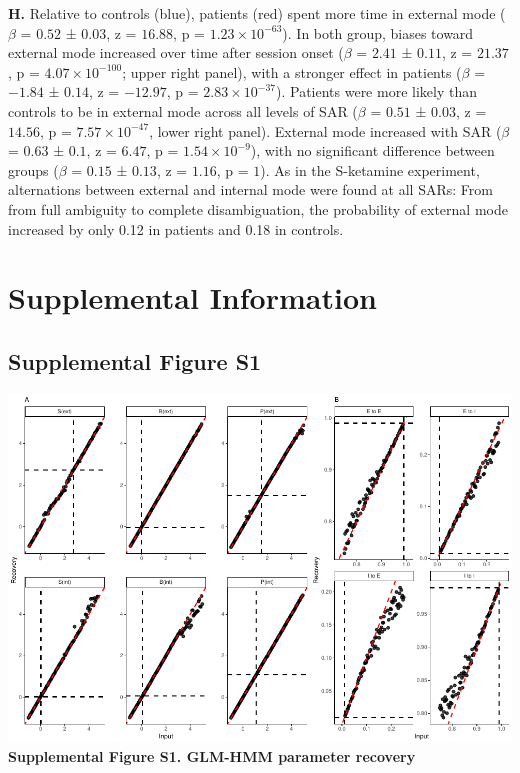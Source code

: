 \documentclass[
]{article}
\begin{document}
\textbf{H.} Relative to controls (blue), patients (red) spent more time
in external mode (\(\beta\) = \(0.52\) ± \(0.03\), z = \(16.88\), p =
\(\ensuremath{1.23\times 10^{-63}}\)). In both group, biases toward
external mode increased over time after session onset (\(\beta\) =
\(2.41\) ± \(0.11\), z = \(21.37\), p =
\(\ensuremath{4.07\times 10^{-100}}\); upper right panel), with a
stronger effect in patients (\(\beta\) = \(-1.84\) ± \(0.14\), z =
\(-12.97\), p = \(\ensuremath{2.83\times 10^{-37}}\)). Patients were
more likely than controls to be in external mode across all levels of
SAR (\(\beta\) = \(0.51\) ± \(0.03\), z = \(14.56\), p =
\(\ensuremath{7.57\times 10^{-47}}\), lower right panel). External mode
increased with SAR (\(\beta\) = \(0.63\) ± \(0.1\), z = \(6.47\), p =
\(\ensuremath{1.54\times 10^{-9}}\)), with no significant difference
between groups (\(\beta\) = \(0.15\) ± \(0.13\), z = \(1.16\), p =
\(1\)). As in the S-ketamine experiment, alternations between external
and internal mode were found at all SARs: From from full ambiguity to
complete disambiguation, the probability of external mode increased by
only 0.12 in patients and 0.18 in controls.

\newpage

\section{Supplemental Information}\label{supplemental-information}

\subsection{Supplemental Figure S1}\label{supplemental-figure-s1}

\includegraphics{modes_ketamine_scz_files/figure-latex/Supplemental_Figure_S1-1.pdf}
\textbf{Supplemental Figure S1. GLM-HMM parameter recovery}
\end{document}
